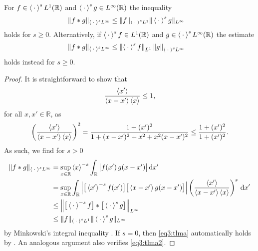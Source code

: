 \documentclass[../dissertation]{subfiles}
\begin{document}
\begin{tlma}\label{tlma2:1}
	For $f \in \left\langle \kern 0.5ex \cdot \kern 0.5ex \right\rangle^s L^1(\mathbb R)$ and 
	$\left\langle \kern 0.5ex \cdot \kern 0.5ex \right\rangle^s g \in L^\infty(\mathbb R)$ the inequality 
	\begin{align} \label{eq3:tlma}
		\| f * g\|_{\left\langle \kern 0.5ex \cdot \kern 0.5ex \right\rangle^s L^\infty}
			&\leq \|f\|_{\left\langle \kern 0.5ex \cdot \kern 0.5ex \right\rangle^s L^1} \|\left\langle \kern 0.5ex \cdot \kern 0.5ex \right\rangle^s g\|_{L^\infty}
	\end{align}
	holds for $s\geq0$. Alternatively, if $\left\langle \kern 0.5ex \cdot \kern 0.5ex \right\rangle^s f \in L^1(\mathbb R)$
	and $g \in \left\langle \kern 0.5ex \cdot \kern 0.5ex \right\rangle^s L^\infty(\mathbb R)$ the estimate
	\begin{align}\label{eq3:tlma2}
		\| f * g\|_{\left\langle \kern 0.5ex \cdot \kern 0.5ex \right\rangle^s L^\infty}
			&\leq \left\| \left\langle \kern 0.5ex \cdot \kern 0.5ex \right\rangle^s f \right\|_{L^1}  \left\| g \right\|_{\left\langle \kern 0.5ex \cdot \kern 0.5ex \right\rangle^s L^\infty}
	\end{align}
	holds instead for $s \geq 0$. 
\end{tlma}
\begin{proof}
	It is straightforward to show that
	\begin{align*}
		\frac{\left\langle x' \right\rangle}{\left\langle x-x' \right\rangle\left\langle x \right\rangle} \leq 1,
	\end{align*}
	for all $x, x' \in \mathbb R$, as
	\begin{align*}
		\left(\frac{\left\langle x' \right\rangle}{\left\langle x-x' \right\rangle\left\langle x \right\rangle}\right)^2
			= \frac{1+(x')^2}{1+(x-x')^2 + x^2 + x^2(x-x')^2}
			\leq \frac{1+(x')^2}{1+(x')^2}.
	\end{align*}
	As such, we find for $s> 0$ 
	\begin{align*}
		\| f * g\|_{\left\langle \kern 0.5ex \cdot \kern 0.5ex \right\rangle^s L^\infty}
			&= \sup_{x\in\mathbb R} \left\langle x \right\rangle^{-s} 
				\int_{\mathbb R}
					\big| 
						f(x') \, g(x-x')
					\big|
				\, \mathrm{d}x'
				\\
			&= \sup_{x\in\mathbb R}
				\int_{\mathbb R}
					\Big| 
						\big[\left\langle x' \right\rangle^{-s} f(x')\big]
						\big[\left\langle x-x' \right\rangle g(x-x') \big]
					\Big|
						\left(
							\frac{\left\langle x' \right\rangle}{\left\langle x-x' \right\rangle\left\langle x \right\rangle}
						\right)^s
				\, \mathrm{d}x'
				\\
			&\leq 
				\left\|
						\big[\left\langle \kern 0.5ex \cdot \kern 0.5ex \right\rangle^{-s} f \big]
						*
						\big[\left\langle \kern 0.5ex \cdot \kern 0.5ex \right\rangle^{s} g \big]
				\right\|_{L^\infty} \\
			&\leq 
				\|f\|_{\left\langle \kern 0.5ex \cdot \kern 0.5ex \right\rangle^s L^1} \|\left\langle \kern 0.5ex \cdot \kern 0.5ex \right\rangle^s g\|_{L^\infty}
	\end{align*}
	by Minkowski's integral inequality \cite[Theorem 1.2.10]{Grafakos}. 
	If $s=0$, then \eqref{eq3:tlma} automatically holds by 
	\cite[Theorem 1.2.10]{Grafakos}. An analogous argument also verifies 
	\eqref{eq3:tlma2}.
\end{proof}
\end{document}
